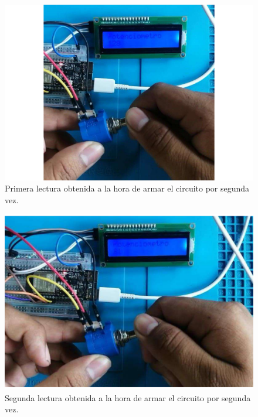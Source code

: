 \begin{figure}[H]
        \centering
        \includegraphics[trim = {50mm 20mm 0mm 5mm},clip,scale=0.3]{19/Img/evidenciaCambio5.pdf}
        \caption{Primera lectura obtenida a la hora de armar el circuito por segunda vez.}
        \label{fig:evidenciaCambio5}
    \end{figure}
    \begin{figure}[H]
        \centering
        \includegraphics[trim = {50mm 20mm 0mm 10mm},clip,scale=0.3]{19/Img/evidenciaCambio6.pdf}
        \caption{Segunda lectura obtenida a la hora de armar el circuito por segunda vez.}
        \label{fig:evidenciaCambio6}
    \end{figure}

